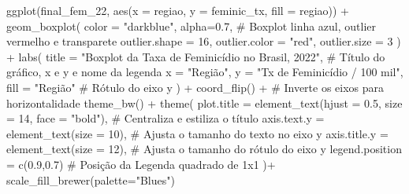 \documentclass[
  letterpaper,
  DIV=11,
  numbers=noendperiod]{scrreprt}
\newenvironment{Shaded}{\begin{snugshade}}{\end{snugshade}}
\newcommand{\AttributeTok}[1]{\textcolor[rgb]{0.40,0.45,0.13}{#1}}
\newcommand{\CommentTok}[1]{\textcolor[rgb]{0.37,0.37,0.37}{#1}}
\newcommand{\DecValTok}[1]{\textcolor[rgb]{0.68,0.00,0.00}{#1}}
\newcommand{\FloatTok}[1]{\textcolor[rgb]{0.68,0.00,0.00}{#1}}
\newcommand{\FunctionTok}[1]{\textcolor[rgb]{0.28,0.35,0.67}{#1}}
\newcommand{\NormalTok}[1]{\textcolor[rgb]{0.00,0.23,0.31}{#1}}
\newcommand{\SpecialCharTok}[1]{\textcolor[rgb]{0.37,0.37,0.37}{#1}}
\newcommand{\StringTok}[1]{\textcolor[rgb]{0.13,0.47,0.30}{#1}}
\begin{document}
\begin{Shaded}
\begin{Highlighting}[]
\FunctionTok{ggplot}\NormalTok{(final\_fem\_22, }\FunctionTok{aes}\NormalTok{(}\AttributeTok{x =}\NormalTok{ regiao, }\AttributeTok{y =}\NormalTok{ feminic\_tx, }\AttributeTok{fill =}\NormalTok{ regiao)) }\SpecialCharTok{+}
  \FunctionTok{geom\_boxplot}\NormalTok{( }
    \AttributeTok{color =} \StringTok{"darkblue"}\NormalTok{, }\AttributeTok{alpha=}\FloatTok{0.7}\NormalTok{,                                     }\CommentTok{\# Boxplot linha azul, outlier vermelho e transparete }
    \AttributeTok{outlier.shape =} \DecValTok{16}\NormalTok{, }\AttributeTok{outlier.color =} \StringTok{"red"}\NormalTok{, }\AttributeTok{outlier.size =} \DecValTok{3}
\NormalTok{              ) }\SpecialCharTok{+} 
  \FunctionTok{labs}\NormalTok{(}
    \AttributeTok{title =} \StringTok{"Boxplot da Taxa de Feminicídio no Brasil, 2022"}\NormalTok{,         }\CommentTok{\# Título do gráfico, x e y e nome da legenda}
    \AttributeTok{x =} \StringTok{"Região"}\NormalTok{,                                                   }
    \AttributeTok{y =} \StringTok{"Tx de Feminicídio / 100 mil"}\NormalTok{,}
    \AttributeTok{fill =} \StringTok{"Região"}  \CommentTok{\# Rótulo do eixo y}
\NormalTok{      ) }\SpecialCharTok{+}
  \FunctionTok{coord\_flip}\NormalTok{() }\SpecialCharTok{+}                                                      \CommentTok{\# Inverte os eixos para horizontalidade}
  \FunctionTok{theme\_bw}\NormalTok{() }\SpecialCharTok{+} 
  \FunctionTok{theme}\NormalTok{(}
    \AttributeTok{plot.title =} \FunctionTok{element\_text}\NormalTok{(}\AttributeTok{hjust =} \FloatTok{0.5}\NormalTok{, }\AttributeTok{size =} \DecValTok{14}\NormalTok{, }\AttributeTok{face =} \StringTok{"bold"}\NormalTok{), }\CommentTok{\# Centraliza e estiliza o título}
    \AttributeTok{axis.text.y =} \FunctionTok{element\_text}\NormalTok{(}\AttributeTok{size =} \DecValTok{10}\NormalTok{),                           }\CommentTok{\# Ajusta o tamanho do texto no eixo y}
    \AttributeTok{axis.title.y =} \FunctionTok{element\_text}\NormalTok{(}\AttributeTok{size =} \DecValTok{12}\NormalTok{),                          }\CommentTok{\# Ajusta o tamanho do rótulo do eixo y}
    \AttributeTok{legend.position =} \FunctionTok{c}\NormalTok{(}\FloatTok{0.9}\NormalTok{,}\FloatTok{0.7}\NormalTok{)                                     }\CommentTok{\# Posição da Legenda quadrado de 1x1}
\NormalTok{  )}\SpecialCharTok{+}
\FunctionTok{scale\_fill\_brewer}\NormalTok{(}\AttributeTok{palette=}\StringTok{"Blues"}\NormalTok{)}
\end{Highlighting}
\end{Shaded}
\end{document}
